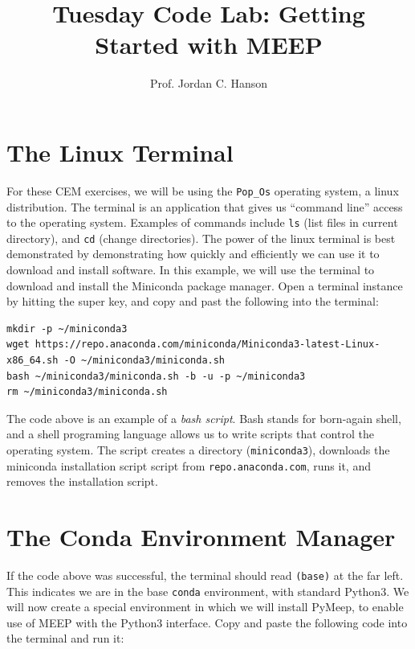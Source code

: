 \documentclass[10pt]{article}
\begin{document}
\title{Tuesday Code Lab: Getting Started with MEEP}
\author{Prof. Jordan C. Hanson}

\maketitle

\section{The Linux Terminal}

For these CEM exercises, we will be using the \verb+Pop_Os+ operating system, a linux distribution.  The terminal is an application that gives us ``command line'' access to the operating system.  Examples of commands include \verb+ls+ (list files in current directory), and \verb+cd+ (change directories).  The power of the linux terminal is best demonstrated by demonstrating how quickly and efficiently we can use it to download and install software.  In this example, we will use the terminal to download and install the Miniconda package manager.  Open a terminal instance by hitting the super key, and copy and past the following into the terminal:
\begin{verbatim}
mkdir -p ~/miniconda3
wget https://repo.anaconda.com/miniconda/Miniconda3-latest-Linux-x86_64.sh -O ~/miniconda3/miniconda.sh
bash ~/miniconda3/miniconda.sh -b -u -p ~/miniconda3
rm ~/miniconda3/miniconda.sh
\end{verbatim}
\noindent
The code above is an example of a \textit{bash script}.  Bash stands for born-again shell, and a shell programing language allows us to write scripts that control the operating system.  The script creates a directory (\verb+miniconda3+), downloads the miniconda installation script script from \verb+repo.anaconda.com+, runs it, and removes the installation script.

\section{The Conda Environment Manager}

If the code above was successful, the terminal should read \verb+(base)+ at the far left. This indicates we are in the base \verb+conda+ environment, with standard Python3.  We will now create a special environment in which we will install PyMeep, to enable use of MEEP with the Python3 interface.  Copy and paste the following code into the terminal and run it:
\end{document}
